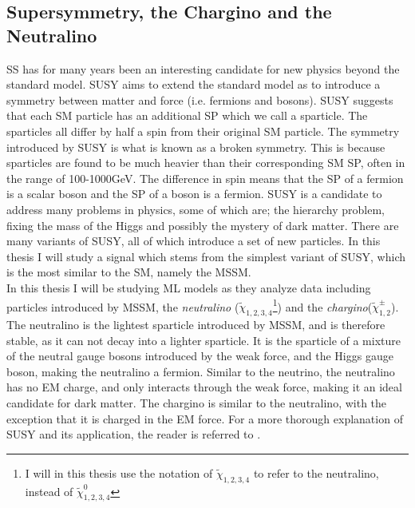 \subsection{Supersymmetry, the Chargino and the Neutralino}\label{subsec:SS}
\acf{SS} has for many years been an interesting candidate for new physics beyond the standard 
model. \ac{SUSY} aims to extend the standard model as to introduce a symmetry between matter and force (i.e. fermions and bosons). 
\ac{SUSY} suggests that each \ac{SM} particle has an additional \ac{SP} which we call a sparticle. 
The sparticles all differ by half a spin from their original \ac{SM} particle. The symmetry introduced by \ac{SUSY} is what 
is known as a broken symmetry. This is because sparticles are found to be much heavier than their corresponding \ac{SM} \ac{SP}, 
often in the range of 100-1000GeV. The difference in spin means that the \ac{SP} of a fermion is a scalar boson and the \ac{SP} 
of a boson is a fermion. \ac{SUSY} is a candidate to address many problems in physics, some of which are; the hierarchy problem, fixing 
the mass of the Higgs and possibly the mystery of dark matter. There are many variants of \ac{SUSY}, all of which introduce a set 
of new particles. In this thesis I will study a signal which stems from the simplest variant of \ac{SUSY}, which is the most 
similar to the \ac{SM}, namely the \ac{MSSM}. 
\\
In this thesis I will be studying \ac{ML} models as they analyze data including particles introduced by \ac{MSSM}, the \emph{neutralino} ($\tilde{\chi}_{1,2,3,4}$\footnote{I will in this thesis 
use the notation of $\tilde{\chi}_{1,2,3,4}$ to refer to the neutralino, instead of $\tilde{\chi}^0_{1,2,3,4}$}) and 
the \emph{chargino}($\tilde{\chi}^{\pm}_{1,2}$). The neutralino is the lightest sparticle introduced by \ac{MSSM}, and is therefore stable, as it can not decay into a lighter sparticle. 
It is the sparticle of a mixture of the neutral gauge bosons introduced by the weak force, and the Higgs gauge boson, making the neutralino a 
fermion. Similar to the neutrino, the neutralino has no \ac{EM} charge, and only interacts through the weak force, making it an ideal candidate 
for dark matter. The chargino is similar to the neutralino, with the exception that it is charged in the \ac{EM} force. 
For a more thorough explanation of \ac{SUSY} and its application, the reader is referred to \cite{SUSY}. 